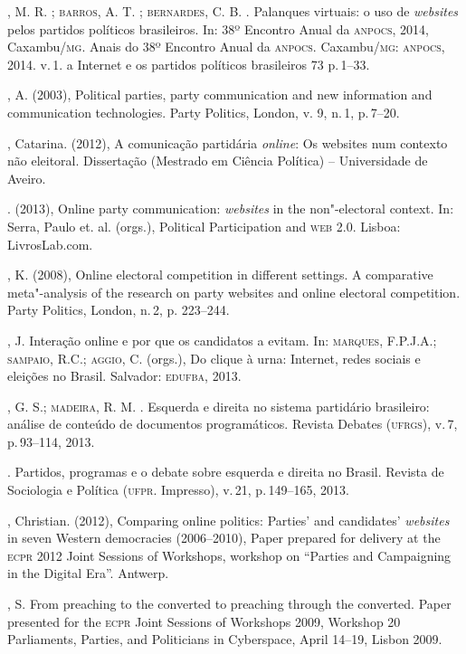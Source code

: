 \begin{bibliohedra}
, M. R. ; \textsc{barros}, A. T. ; \textsc{bernardes}, C. B. . Palanques
virtuais: o uso de \textit{websites} pelos partidos políticos brasileiros. In:
38º Encontro Anual da \textsc{anpocs}, 2014, Caxambu/\textsc{mg}. Anais do 38º Encontro
Anual da \textsc{anpocs}. Caxambu/\textsc{mg}: \textsc{anpocs}, 2014. v.\,1. a Internet e os
partidos políticos brasileiros 73 p.\,1--33.

, A. (2003), Political parties, party communication and new
information and communication technologies. Party Politics, London, v.
9, n.\,1, p.\,7--20.

, Catarina. (2012), A comunicação partidária \textit{\textit{online}}: Os websites
num contexto não eleitoral. Dissertação (Mestrado em Ciência Política)
-- Universidade de Aveiro.

\titidem. (2013), Online party communication: \textit{websites} in the
non"-electoral context. In: Serra, Paulo et. al. (orgs.), Political
Participation and \textsc{web 2.0}. Lisboa: LivrosLab.com.


, K. (2008), Online electoral competition in different
settings. A comparative meta"-analysis of the research on party websites
and online electoral competition. Party Politics, London, n.\,2, p.
223--244.

, J. Interação online e por que os candidatos a evitam.
In: \textsc{marques}, F.P.J.A.; \textsc{sampaio}, R.C.; \textsc{aggio}, C. (orgs.), Do clique à
urna: Internet, redes sociais e eleições no Brasil. Salvador: \textsc{edufba},
2013.

, G. S.; \textsc{madeira}, R. M. . Esquerda e direita no sistema
partidário brasileiro: análise de conteúdo de documentos programáticos.
Revista Debates (\textsc{ufrgs}), v.\,7, p.\,93--114, 2013.

\titidem. Partidos, programas e o debate sobre
esquerda e direita no Brasil. Revista de Sociologia e Política (\textsc{ufpr}.
Impresso), v.\,21, p.\,149--165, 2013.

, Christian. (2012), Comparing online politics: Parties' and
candidates' \textit{websites} in seven Western democracies (2006--2010), Paper
prepared for delivery at the \textsc{ecpr} 2012 Joint Sessions of Workshops,
workshop on ``Parties and Campaigning in the Digital Era''. Antwerp.

, S. From preaching to the converted to preaching through the
converted. Paper presented for the \textsc{ecpr} Joint Sessions of Workshops
2009, Workshop 20 Parliaments, Parties, and Politicians in Cyberspace,
April 14--19, Lisbon 2009.


\end{bibliohedra}
